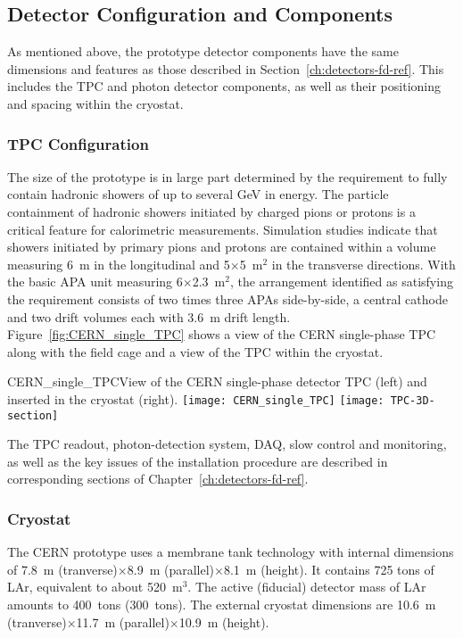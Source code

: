 \subsection{Detector Configuration and Components}

As mentioned above, the prototype detector components have 
the same dimensions and features as those described in
Section~\ref{ch:detectors-fd-ref}. This includes the TPC and photon
detector components, as well as their positioning and spacing within
the cryostat.


\subsubsection{TPC Configuration}

The size of the prototype is in large part determined by the
requirement to fully contain hadronic showers of up to several GeV in
energy.  The particle containment of hadronic showers initiated by
charged pions or protons is a critical feature for calorimetric
measurements. Simulation studies indicate that showers initiated by
 primary pions and protons are contained within a volume
measuring 6~m in the longitudinal and 5$\times$5~m$^2$ in the
transverse directions. With the basic APA unit measuring
6$\times$2.3~m$^2$, the arrangement identified as satisfying the
requirement consists of two times three APAs side-by-side, a central
cathode and two drift volumes each with 3.6~m drift
length. Figure~\ref{fig:CERN_single_TPC} shows a view of the CERN
single-phase TPC along with the field cage and a view of the TPC
within the cryostat.
%
\begin{cdrfigure}{CERN_single_TPC}{View of the CERN single-phase detector TPC (left) and inserted in the cryostat (right). }
\texttt{[image: CERN\_single\_TPC]}
\texttt{[image: TPC-3D-section]}
\end{cdrfigure}
%
The TPC readout, photon-detection system, DAQ, slow control and
monitoring, as well as the key issues of the installation procedure
are described in corresponding sections of
Chapter~\ref{ch:detectors-fd-ref}.

\subsubsection{Cryostat}

The CERN prototype uses a membrane tank technology with internal
dimensions of 7.8~m (tranverse)$\times$8.9~m (parallel)$\times$8.1~m
(height).  It contains 725 tons of LAr, equivalent to about
520~m$^3$. The active (fiducial) detector mass of LAr amounts to
400~tons (300~tons).  The external cryostat dimensions are 10.6~m
(tranverse)$\times$11.7~m (parallel)$\times$10.9~m (height).

